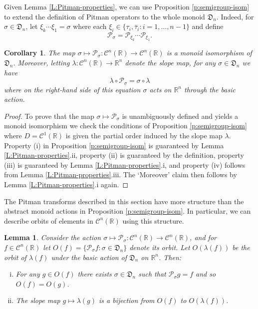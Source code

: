 \documentclass[11pt]{article}
\newcommand{\R}{\mathbb{R}}
\newcommand{\sig}{\sigma}
\newcommand{\la}{\lambda}
\newcommand{\cC}{\mathcal{C}}
\newcommand{\cP}{\mathcal{P}}
\newtheorem{lemma}[theorem]{Lemma}
\newtheorem{corollary}[theorem]{Corollary}
\theoremstyle{definition} %
\theoremstyle{remark} %
\begin{document}
Given Lemma \ref{L:Pitman-properties}, we can use Proposition \ref{p:semigroup-isom} to extend the definition of Pitman operators to the whole monoid $\mathfrak{D}_n$. Indeed, for $\sig \in \mathfrak{D}_n$, let $\xi_k \cdots \xi_1 = \sig$ where each $\xi_i \in \{\tau_i, \bar \tau_i : i = 1, \dots, n-1\}$ and define
$$
\cP_{\sig} = \cP_{\xi_k} \cdots \cP_{\xi_1}.
$$ 
\begin{corollary}
	\label{C:Pitman-iso}
The map $\sig \mapsto \cP_{\sig}:\cC^n(\R) \to \cC^n(\R)$ is a monoid isomorphism of $\mathfrak{D}_n$. Moreover, letting $\la:\cC^n(\R) \to \R^n$ denote the slope map, for any $\sig \in \mathfrak{D}_n$ we have 
$$
\la \circ \cP_{\sig} = \sig \circ \la
$$
where on the right-hand side of this equation $\sig$ acts on $\R^n$ through the basic action. 
\end{corollary}

\begin{proof}
To prove that the map $\sig \mapsto \cP_{\sig}$ is unambiguously defined and yields a monoid isomorphism we check the conditions of Proposition \ref{p:semigroup-isom} where $D = \cC^1(\R)$ is given the partial order induced by the slope map $\la$. Property (i) in Proposition \ref{p:semigroup-isom} is guaranteed by Lemma \ref{L:Pitman-properties}.ii, property (ii) is guaranteed by the definition, property (iii) is guaranteed by Lemma \ref{L:Pitman-properties}.i, and property (iv) follows from Lemma \ref{L:Pitman-properties}.iii. The `Moreover' claim then follows by Lemma \ref{L:Pitman-properties}.i again.
\end{proof}

The Pitman transforms described in this section have more structure than the abstract monoid actions in Proposition \ref{p:semigroup-isom}. In particular, we can describe orbits of elements in $\cC^n(\R)$ using this structure.

\begin{lemma}
	\label{L:orbits}
Consider the action $\sig \mapsto \cP_{\sig}:\cC^n(\R) \to \cC^n(\R)$, and for $f \in \cC^n(\R)$ let $O(f) = \{ \cP_\sig f : \sig \in \mathfrak{D}_n\}$ denote its orbit. Let $O(\la(f))$ be the orbit of $\la(f)$ under the basic action of $\mathfrak{D}_n$ on $\R^n$. Then:
	\begin{enumerate}[i.]
		\item For any $g \in O(f)$ there exists $\sig \in \mathfrak{D}_n$ such that $\cP_\sig g = f$ and so $O(f) = O(g)$.
		\item The slope map $g \mapsto \la(g)$ is a bijection from $O(f)$ to $O(\la(f))$.
	\end{enumerate}
\end{lemma}
\end{document}
